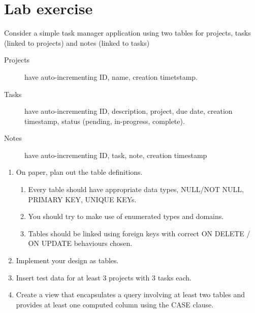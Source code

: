 \section{Lab exercise}


Consider a simple task manager application using two tables for projects, tasks (linked to projects) and notes (linked to tasks)
\begin{description}
\item[Projects] have auto-incrementing ID, name, creation timetstamp.
\item[Tasks] have auto-incrementing ID, description, project, due date, creation timestamp, status (pending, in-progress, complete).
\item[Notes] have auto-incrementing ID, task, note, creation timestamp
\end{description}

\begin{enumerate}
\item On paper, plan out the table definitions.
  \begin{enumerate}
  \item Every table should have appropriate data types, NULL/NOT NULL, PRIMARY KEY, UNIQUE KEYs.
  \item You should try to make use of enumerated types and domains.
  \item Tables should be linked using foreign keys with correct ON DELETE / ON UPDATE behaviours chosen.
  \end{enumerate}
\item Implement your design as tables.
\item Insert test data for at least 3 projects with 3 tasks each. 
\item Create a view that encapsulates a query involving at least two tables and provides at least one computed column using the CASE clause. 
\end{enumerate}



